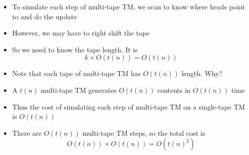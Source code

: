 \begin{frame}[allowframebreaks]
\begin{itemize}
\begin{center}
\end{center}


\item To simulate each step of multi-tape TM, we scan to know where heads point to
  and do the update
\item However, we may have to
right shift the tape 
\item So we need to know the tape length. It is
\begin{equation*}
  k \times O(t(n)) = O(t(n)) 
\end{equation*}
  
\item Note that each tape of multi-tape TM has $O(t(n))$ length. Why?

\item A $t(n)$ multi-tape TM generates
$O(t(n))$ contents in 
$O(t(n))$ time

\item Thus the cost of
  simulating each step of multi-tape TM on a single-tape TM is
  $O(t(n))$
\item There are $O(t(n))$ multi-tape TM steps, so
  the total cost is
  \begin{equation*}
    O(t(n)) \times O(t(n)) = O(t(n)^2)
\end{equation*}
\end{itemize}\end{frame}

